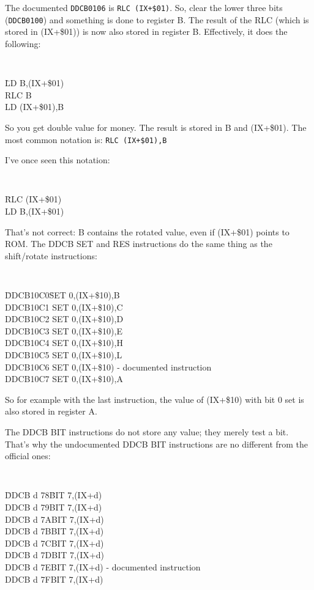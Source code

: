 The documented {\tt DDCB0106} is {\tt RLC (IX+\$01)}. So, clear the lower three bits ({\tt DDCB0100}) and something is done to register B. The result of the RLC (which is stored in (IX+\$01)) is now also stored in register B. Effectively, it does the following:

{\tt 
    \begin{tabbing}
        {\qquad}\=LD B,(IX+\$01)\+\\
        RLC B\\
        LD (IX+\$01),B
    \end{tabbing}
}

So you get double value for money. The result is stored in B and (IX+\$01). The most common notation is: {\tt RLC (IX+\$01),B}

I've once seen this notation:
 
{\tt 
    \begin{tabbing}
        {\qquad}\=RLC (IX+\$01)\+\\
        LD B,(IX+\$01)
    \end{tabbing}
}

That's not correct: B contains the rotated value, even if (IX+\$01) points to ROM. The DDCB SET and RES instructions do the same thing as the shift/rotate instructions:

{\tt 
    \begin{tabbing}
        {\qquad}\=DDCB10C0{\qquad}\=SET 0,(IX+\$10),B\+\\
        DDCB10C1	\>SET 0,(IX+\$10),C\\
        DDCB10C2	\>SET 0,(IX+\$10),D\\
        DDCB10C3	\>SET 0,(IX+\$10),E\\
        DDCB10C4	\>SET 0,(IX+\$10),H\\
        DDCB10C5	\>SET 0,(IX+\$10),L\\
        DDCB10C6	\>SET 0,(IX+\$10) {\rm - documented instruction}\\
        DDCB10C7	\>SET 0,(IX+\$10),A
    \end{tabbing}
}

So for example with the last instruction, the value of (IX+\$10) with bit 0 set is also stored in register A.

The DDCB BIT instructions do not store any value; they merely test a bit. That's why the undocumented DDCB BIT instructions are no different from the official ones:

{\tt 
    \begin{tabbing}
        {\qquad}\=DDCB d 78{\qquad}\=BIT 7,(IX+d)\+\\
        DDCB d 79\>BIT 7,(IX+d)\\
        DDCB d 7A\>BIT 7,(IX+d)\\
        DDCB d 7B\>BIT 7,(IX+d)\\
        DDCB d 7C\>BIT 7,(IX+d)\\
        DDCB d 7D\>BIT 7,(IX+d)\\
        DDCB d 7E\>BIT 7,(IX+d) {\rm - documented instruction}\\
        DDCB d 7F\>BIT 7,(IX+d)
    \end{tabbing}
}


